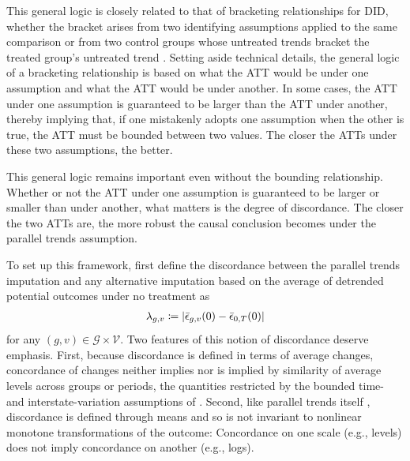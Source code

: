 \documentclass[twoside,11pt]{article}
\begin{document}
This general logic is closely related to that of bracketing relationships for DID, whether the bracket arises from two identifying assumptions applied to the same comparison \citep{angristpischke2008,guryan2001,dingli2019,demetrescuetal2025} or from two control groups whose untreated trends bracket the treated group's untreated trend \citep{hasegawaetal2019,yeetal2024}. Setting aside technical details, the general logic of a bracketing relationship is based on what the \textrm{ATT} would be under one assumption and what the \textrm{ATT} would be under another. In some cases, the \textrm{ATT} under one assumption is guaranteed to be larger than the \textrm{ATT} under another, thereby implying that, if one mistakenly adopts one assumption when the other is true, the \textrm{ATT} must be bounded between two values. The closer the \textrm{ATT}s under these two assumptions, the better.

This general logic remains important even without the bounding relationship. Whether or not the \textrm{ATT} under one assumption is guaranteed to be larger or smaller than under another, what matters is the degree of discordance. The closer the two \textrm{ATT}s are, the more robust the causal conclusion becomes under the parallel trends assumption.

To set up this framework, first define the discordance between the parallel trends imputation and any alternative imputation based on the average of detrended potential outcomes under no treatment as
\begin{align} \label{eq: concordance}
\lambda_{g,v} \coloneqq \lvert\bar{\epsilon}_{g,v}(0) - \bar{\epsilon}_{0,T}(0)\rvert
\end{align}
for any $(g,v) \in \mathcal{G} \times \mathcal{V}$. Two features of this notion of discordance deserve emphasis. First, because discordance is defined in terms of average changes, concordance of changes neither implies nor is implied by similarity of average levels across groups or periods, the quantities restricted by the bounded time- and interstate-variation assumptions of \citet[][pp.~237--238]{manskipepper2018}. Second, like parallel trends itself \citep{rothsantanna2023}, discordance is defined through means and so is not invariant to nonlinear monotone transformations of the outcome: Concordance on one scale (e.g., levels) does not imply concordance on another (e.g., logs).
\end{document}
